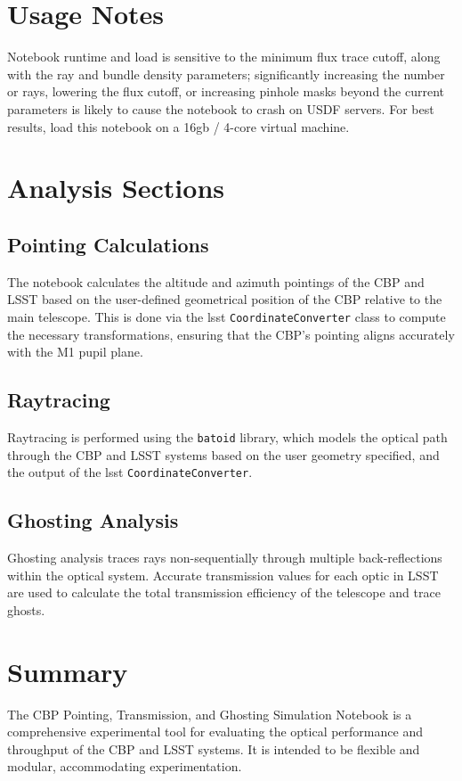 \documentclass[SE,authoryear,toc]{lsstdoc}
\begin{document}
\section{Usage Notes}
Notebook runtime and load is sensitive to the minimum flux trace cutoff, along with the ray and bundle density parameters; significantly increasing the number or rays, lowering the flux cutoff, or increasing pinhole masks beyond the current parameters is likely to cause the notebook to crash on USDF servers. For best results, load this notebook on a 16gb / 4-core virtual machine. 

\section{Analysis Sections}

\subsection{Pointing Calculations}
The notebook calculates the altitude and azimuth pointings of the CBP and LSST based on the user-defined geometrical position of the CBP relative to the main telescope. This is done via the lsst \texttt{CoordinateConverter} class to compute the necessary transformations, ensuring that the CBP's pointing aligns accurately with the M1 pupil plane.

\subsection{Raytracing}
Raytracing is performed using the \texttt{batoid} library, which models the optical path through the CBP and LSST systems based on the user geometry specified, and the output of the lsst \texttt{CoordinateConverter}. 

\subsection{Ghosting Analysis}
Ghosting analysis traces rays non-sequentially through multiple back-reflections within the optical system. Accurate transmission values for each optic in LSST are used to calculate the total transmission efficiency of the telescope and trace ghosts.

\section{Summary}
The CBP Pointing, Transmission, and Ghosting Simulation Notebook is a comprehensive experimental tool for evaluating the optical performance and throughput of the CBP and LSST systems. It is intended to be flexible and modular, accommodating experimentation.
\end{document}
